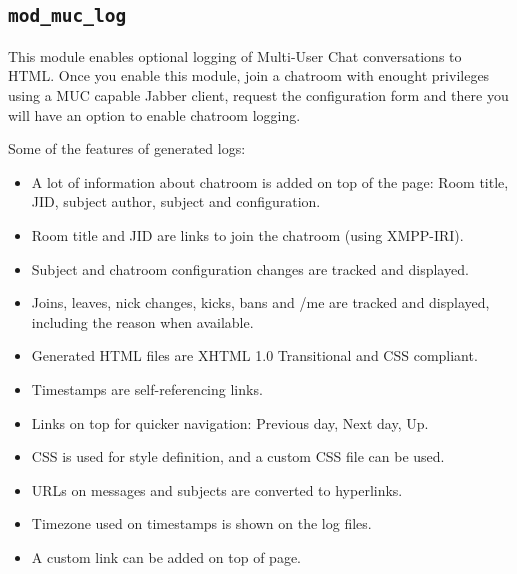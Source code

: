 \documentclass[a4paper,10pt]{article}
\newcommand{\ind}[1]{\begin{latexonly}\index{#1}\end{latexonly}}
\newcommand{\module}[1]{\texttt{#1}}
\newcommand{\modmuclog}{\module{mod\_muc\_log}}
\begin{document}
\subsection{\modmuclog{}}
\label{sec:modmuclog}
\ind{modules!\modmuclog{}}

This module enables optional logging of Multi-User Chat conversations to HTML.
Once you enable this module, join a chatroom with enought privileges using a MUC capable Jabber client,
request the configuration form and there you will have an option to enable chatroom logging.

Some of the features of generated logs:
\begin{itemize}
\item A lot of information about chatroom is added on top of the page: Room title, JID, subject author, subject and configuration.
\item Room title and JID are links to join the chatroom (using XMPP-IRI).
\item Subject and chatroom configuration changes are tracked and displayed.
\item Joins, leaves, nick changes, kicks, bans and /me are tracked and displayed, including the reason when available.
\item Generated HTML files are XHTML 1.0 Transitional and CSS compliant.
\item Timestamps are self-referencing links.
\item Links on top for quicker navigation: Previous day, Next day, Up.
\item CSS is used for style definition, and a custom CSS file can be used.
\item URLs on messages and subjects are converted to hyperlinks.
\item Timezone used on timestamps is shown on the log files.
\item A custom link can be added on top of page.
\end{itemize}
\end{document}
